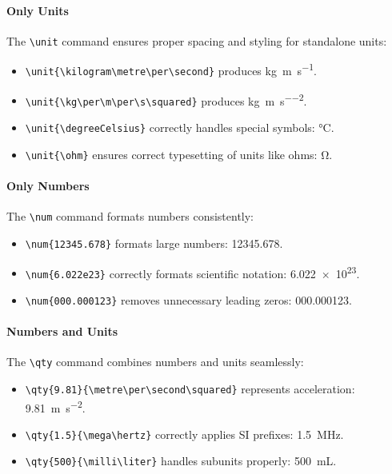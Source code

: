     \paragraph*{Only Units}

    The \verb|\unit| command ensures proper spacing and styling for standalone units:
    \begin{itemize}
        \item \verb|\unit{\kilogram\metre\per\second}| produces \unit{\kilogram\metre\per\second}.
        \item \verb|\unit{\kg\per\m\per\s\squared}| produces \unit{\kg\per\m\per\s\squared}.
        \item \verb|\unit{\degreeCelsius}| correctly handles special symbols: \unit{\degreeCelsius}.
        \item \verb|\unit{\ohm}| ensures correct typesetting of units like ohms: \unit{\ohm}.
    \end{itemize}

    \paragraph*{Only Numbers}

    The \verb|\num| command formats numbers consistently:
    \begin{itemize}
        \item \verb|\num{12345.678}| formats large numbers: \num{12345.678}.
        \item \verb|\num{6.022e23}| correctly formats scientific notation: \num{6.022e23}.
        \item \verb|\num{000.000123}| removes unnecessary leading zeros: \num{000.000123}.
    \end{itemize}

    \paragraph*{Numbers and Units}

    The \verb|\qty| command combines numbers and units seamlessly:
    \begin{itemize}
        \item \verb|\qty{9.81}{\metre\per\second\squared}| represents acceleration: \qty{9.81}{\metre\per\second\squared}.
        \item \verb|\qty{1.5}{\mega\hertz}| correctly applies SI prefixes: \qty{1.5}{\mega\hertz}.
        \item \verb|\qty{500}{\milli\liter}| handles subunits properly: \qty{500}{\milli\liter}.
    \end{itemize}

